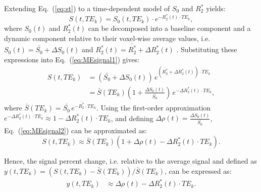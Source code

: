 Extending Eq.~(\ref{eq:st}) to a time-dependent model of $S_0$ and $R_2^*$ yields:
\begin{equation}\label{eq:MEsignal1}
    S(t,TE_k ) = S_0(t,TE_k)\cdot e^{-R_2^*(t)\cdot TE_k},
\end{equation}
where $S_0(t)$ and $R_2^*(t)$ can be decomposed into a baseline component and a dynamic component relative to their voxel-wise average values, i.e. $S_0(t)=\bar{S_0}+\Delta S_0(t)$ and $R_2^*(t)=\bar{R_2^*}+\Delta R_2^*(t)$ \citep{kundu2012differentiating}. Substituting these expressions into Eq.~(\ref{eq:MEsignal1}) gives:
\begin{equation}\label{eq:MEsignal2}
\begin{aligned}
    S(t,TE_k)
    &= \left(\bar{S_0}+ \Delta S_0(t)\right)\, e^{\left(\bar{R_2^*}+ \Delta R_2^*(t)\right)\cdot TE_k} \\
    &= \bar{S}\left(TE_k\right)\left(1+\frac{\Delta S_0(t)}{\bar{S_0}} \right)\, e^{- \Delta R_2^*(t)\cdot TE_k},
\end{aligned}
\end{equation}
where $\bar{S}\left(TE_k\right)=\bar{S_0}\,e^{-\bar{R_2^*}\cdot TE_k}$. Using the first-order approximation $e^{- \Delta R_2^*(t)\cdot TE_k} \approx 1 - \Delta R_2^*(t)\cdot TE_k$, and defining $\Delta \rho(t) = \frac{\Delta S_0(t)}{\bar{S_0}}$, Eq.~(\ref{eq:MEsignal2}) can be approximated as:
\begin{equation}
    S(t,TE_k) \approx \bar{S}(TE_k)\left(1 + \Delta \rho(t) - \Delta R_2^*(t)\cdot TE_k\right).
\end{equation}

Hence, the signal percent change, i.e. relative to the average signal and defined as $y(t,TE_k)=(S(t,TE_k)-\bar{S}(TE_k))/\bar{S}(TE_k)$, can be expressed as:
\begin{equation}\label{eq:spcbold}
\begin{aligned}
    y(t,TE_k) 
    &\approx \Delta \rho(t) - \Delta R_2^*(t)\cdot TE_k. \\
\end{aligned}
\end{equation}


